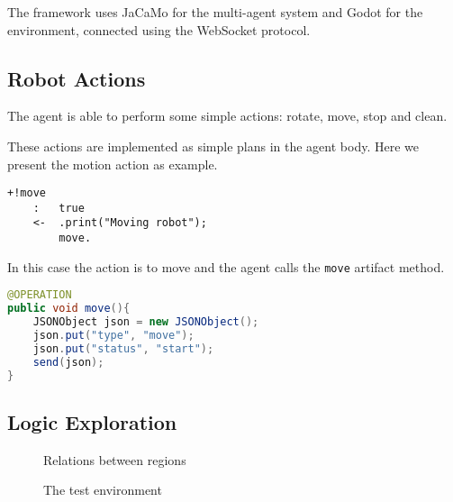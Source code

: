 \label{sec:design_and_implementation}
The framework uses JaCaMo for the multi-agent system and Godot for the environment, connected using the WebSocket protocol.

\subsection{Robot Actions}
The agent is able to perform some simple actions: rotate, move, stop and clean.
\begin{figure}
    \centering
\end{figure}
These actions are implemented as simple plans in the agent body.
Here we present the motion action as example.
\begin{lstlisting}[language=AgentSpeak]
+!move
    :   true
    <-  .print("Moving robot");
        move.
\end{lstlisting}
In this case the action is to move and the agent calls the \lstinline{move} artifact method.
\begin{lstlisting}[language=java]
@OPERATION
public void move(){
    JSONObject json = new JSONObject();
    json.put("type", "move");
    json.put("status", "start");
    send(json);
}
\end{lstlisting}

\subsection{Logic Exploration}

\begin{figure}
    \centering
    
    \label{fig:relations}
    \caption{Relations between regions}
\end{figure}

\begin{figure}[ht]
    \centering
    
    \label{fig:environment}
    \caption{The test environment}
\end{figure}
